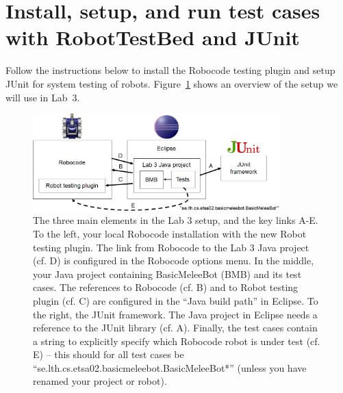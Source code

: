 \documentclass{scrreprt}
\begin{document}
\section{Install, setup, and run test cases with RobotTestBed and JUnit}
Follow the instructions below to install the Robocode testing plugin and setup JUnit for system testing of robots. Figure~\ref{fig:overview} shows an overview of the setup we will use in Lab~3.

\begin{figure}
\centering
\includegraphics[width=0.85\textwidth]{figures/overview.png}
\caption{The three main elements in the Lab 3 setup, and the key links A-E. To the left, your local Robocode installation with the new Robot testing plugin. The link from Robocode to the Lab 3 Java project (cf. D) is configured in the Robocode options menu. In the middle, your Java project containing BasicMeleeBot (BMB) and its test cases. The references to Robocode (cf. B) and to Robot testing plugin (cf. C) are configured in the ``Java build path'' in Eclipse. To the right, the JUnit framework. The Java project in Eclipse needs a reference to the JUnit library (cf. A). Finally, the test cases contain a string to explicitly specify which Robocode robot is under test (cf. E) -- this should for all test cases be ``se.lth.cs.etsa02.basicmeleebot.BasicMeleeBot*'' (unless you have renamed your project or robot).}
\label{fig:overview}
\end{figure}
\end{document}

